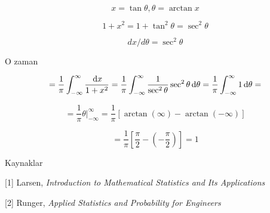 \documentclass[12pt,fleqn]{article}\usepackage{../../common}
\begin{document}
$$  x = \tan \theta, \theta = \arctan x $$

$$ 1 + x^2 = 1 + \tan^2\theta = \sec^2\theta$$

$$ dx / d\theta = \sec^2\theta $$

O zaman 

$$ =
\frac{ 1}{\pi} \int _{ -\infty}^{\infty} \frac{\,\mathrm{d} x}{1 + x^2}   =
\frac{ 1}{\pi} \int _{ -\infty}^{\infty}  \frac{ 1}{\sec^2\theta}\sec^2\theta \,\mathrm{d}\theta = 
\frac{ 1}{\pi} \int _{ -\infty}^{\infty}  1 \,\mathrm{d}\theta = 
$$

$$ = 
\frac{ 1}{\pi} \theta | _{ -\infty}^{\infty}   = 
\frac{ 1}{\pi} [\arctan(\infty) - \arctan(-\infty)]
 $$

$$ =
\frac{ 1}{\pi} [\frac{ \pi}{2} - (-\frac{ \pi}{2}) ] = 1
 $$



Kaynaklar

[1] Larsen, {\em Introduction to Mathematical Statistics and Its Applications}

[2] Runger, {\em Applied Statistics and Probability for Engineers}
\end{document}
